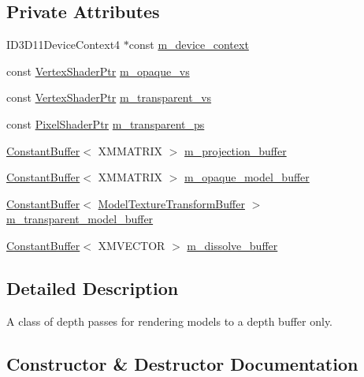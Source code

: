 \subsection*{Private Attributes}
\begin{DoxyCompactItemize}
\item 
I\+D3\+D11\+Device\+Context4 $\ast$const \hyperlink{classmage_1_1_depth_pass_a900800a2d00c1855523a77ec488221fe}{m\+\_\+device\+\_\+context}
\item 
const \hyperlink{namespacemage_a1f19b094f771e30bc0a6c1cebcc0dd58}{Vertex\+Shader\+Ptr} \hyperlink{classmage_1_1_depth_pass_a0b2c770de2a6cc3485740d1d0f7ff503}{m\+\_\+opaque\+\_\+vs}
\item 
const \hyperlink{namespacemage_a1f19b094f771e30bc0a6c1cebcc0dd58}{Vertex\+Shader\+Ptr} \hyperlink{classmage_1_1_depth_pass_acf3baa6d4956c9c8d9ffc27ea1586cc3}{m\+\_\+transparent\+\_\+vs}
\item 
const \hyperlink{namespacemage_acbec875bb5e5e085e32ed244a24d2b6f}{Pixel\+Shader\+Ptr} \hyperlink{classmage_1_1_depth_pass_a8775d8a4a49dc60ad9d343d3895cb714}{m\+\_\+transparent\+\_\+ps}
\item 
\hyperlink{classmage_1_1_constant_buffer}{Constant\+Buffer}$<$ X\+M\+M\+A\+T\+R\+IX $>$ \hyperlink{classmage_1_1_depth_pass_a4c9833ceaf223b73404edab4cf81b7c1}{m\+\_\+projection\+\_\+buffer}
\item 
\hyperlink{classmage_1_1_constant_buffer}{Constant\+Buffer}$<$ X\+M\+M\+A\+T\+R\+IX $>$ \hyperlink{classmage_1_1_depth_pass_a4e466580656eb0602d2e00c29b2435a0}{m\+\_\+opaque\+\_\+model\+\_\+buffer}
\item 
\hyperlink{classmage_1_1_constant_buffer}{Constant\+Buffer}$<$ \hyperlink{structmage_1_1_model_texture_transform_buffer}{Model\+Texture\+Transform\+Buffer} $>$ \hyperlink{classmage_1_1_depth_pass_a4b6a38c56e02b6185c1eef8bcaaa5786}{m\+\_\+transparent\+\_\+model\+\_\+buffer}
\item 
\hyperlink{classmage_1_1_constant_buffer}{Constant\+Buffer}$<$ X\+M\+V\+E\+C\+T\+OR $>$ \hyperlink{classmage_1_1_depth_pass_ab8ef293d922a965a92825b8226b9d87c}{m\+\_\+dissolve\+\_\+buffer}
\end{DoxyCompactItemize}


\subsection{Detailed Description}
A class of depth passes for rendering models to a depth buffer only. 

\subsection{Constructor \& Destructor Documentation}
\hypertarget{classmage_1_1_depth_pass_a16a23f6820a11faf9195b307474e355b}{}\label{classmage_1_1_depth_pass_a16a23f6820a11faf9195b307474e355b} 
